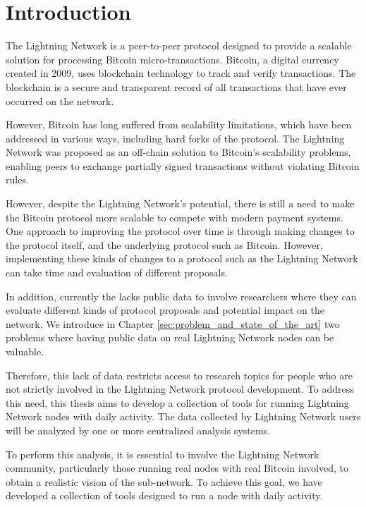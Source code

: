 \setcounter{page}{1}
\chapter{Introduction}\label{sec:introduction}

The Lightning Network is a peer-to-peer protocol designed to
provide a scalable solution for processing Bitcoin micro-transactions.
Bitcoin, a digital currency created in 2009, uses blockchain technology
to track and verify transactions. The blockchain is a secure and transparent
record of all transactions that have ever occurred on the network.

However, Bitcoin has long suffered from scalability limitations, which have been
addressed in various ways, including hard forks of the protocol.
The Lightning Network was proposed as an off-chain solution to Bitcoin's
scalability problems, enabling peers to exchange partially signed transactions
without violating Bitcoin rules.

However, despite the Lightning Network's potential, there is still a need
to make the Bitcoin protocol more scalable
to compete with modern payment systems.
One approach to improving the protocol over time is through making changes
to the protocol itself, and the underlying protocol such as Bitcoin. However,
implementing these kinds of changes to a protocol such as the Lightning Network
can take time and evaluation of different proposals.

In addition, currently the {\LN} lacks public data to involve researchers
where they can evaluate different kinds of protocol proposals and
potential impact on the network. We introduce in Chapter \ref{sec:problem_and_state_of_the_art}
two problems where having public data on real Lightning Network nodes can be valuable.

Therefore, this lack of data restricts access to research topics for
people who are not strictly involved in the Lightning Network protocol development.
To address this need, this thesis aims to develop a collection of tools for
running Lightning Network nodes with daily activity. The data collected by
Lightning Network users will be analyzed by one or more centralized
analysis systems.

To perform this analysis, it is essential to involve the Lightning Network
community, particularly those running real nodes with real Bitcoin involved,
to obtain a realistic vision of the sub-network. To achieve this goal, we have
developed a collection of tools designed to run a node with daily activity.

